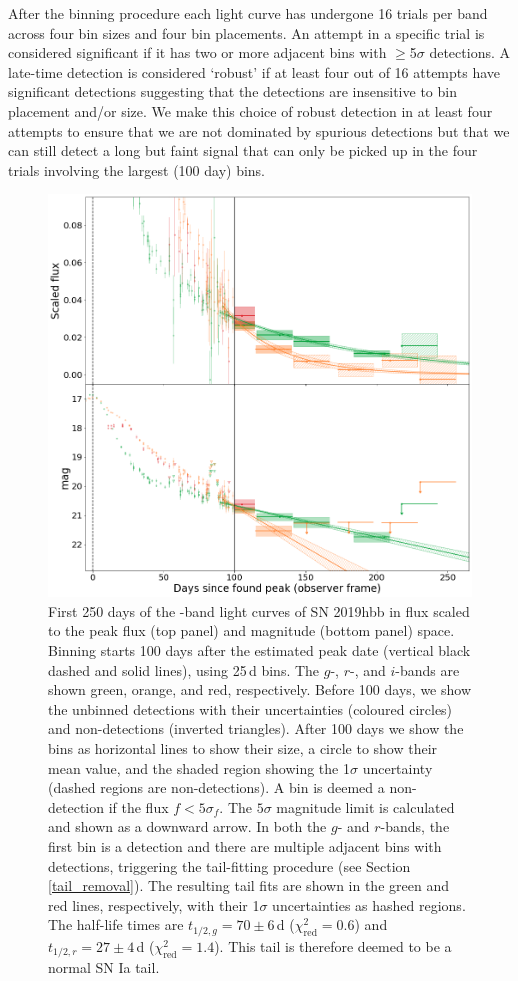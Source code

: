 \documentclass[a4paper,oneside,12pt, class=Latex/Classes/PhDthesisPSnPDF, crop=false]{standalone}
\begin{document}
After the binning procedure each light curve has undergone 16 trials per band across four bin sizes and four bin placements. An attempt in a specific trial is considered significant if it has two or more adjacent bins with $\ge$5$\sigma$ detections. A late-time detection is considered `robust' if at least four out of 16 attempts have significant detections suggesting that the detections are insensitive to bin placement and/or size. We make this choice of robust detection in at least four attempts to ensure that we are not dominated by spurious detections but that we can still detect a long but faint signal that can only be picked up in the four trials involving the largest (100 day) bins. 

\begin{figure}
 \centering
 \includegraphics[width=\textwidth]{../Images/chapter_3/bin_showcase.png}
 \caption{First 250 days of the \ztfg\ztfr\ztfi-band light curves of SN 2019hbb in flux scaled to the peak flux (top panel) and magnitude (bottom panel) space. Binning starts 100 days after the estimated peak date (vertical black dashed and solid lines), using 25\,d bins. The $g$-, $r$-, and $i$-bands are shown green, orange, and red, respectively. Before 100 days, we show the unbinned detections with their uncertainties (coloured circles) and non-detections (inverted triangles). After 100 days we show the bins as horizontal lines to show their size, a circle to show their mean value, and the shaded region showing the 1$\sigma$ uncertainty (dashed regions are non-detections). A bin is deemed a non-detection if the flux $f<5\sigma_f$. The $5\sigma$ magnitude limit is calculated and shown as a downward arrow. In both the $g$- and $r$-bands, the first bin is a detection and there are multiple adjacent bins with detections, triggering the tail-fitting procedure (see Section \ref{tail_removal}). The resulting tail fits are shown in the green and red lines, respectively, with their 1$\sigma$ uncertainties as hashed regions. The half-life times are $t_{1/2,g} = 70 \pm 6$\,d ($\chi^2_\text{red} = 0.6$) and $t_{1/2,r} = 27 \pm 4$\,d ($\chi^2_\text{red} = 1.4$). This tail is therefore deemed to be a normal SN Ia tail.}

\end{figure}
\end{document}

